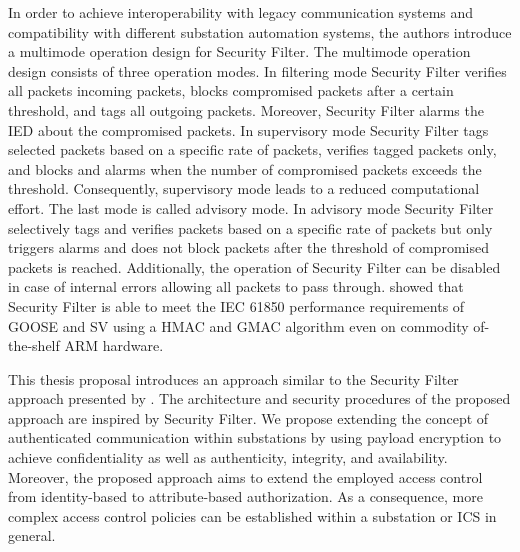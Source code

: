 In order to achieve interoperability with legacy communication systems and compatibility with different substation automation systems, the authors introduce a multimode operation design for Security Filter.
The multimode operation design consists of three operation modes.
In filtering mode Security Filter verifies all packets incoming packets, blocks compromised packets after a certain threshold, and tags all outgoing packets.
Moreover, Security Filter alarms the IED about the compromised packets.
In supervisory mode Security Filter tags selected packets based on a specific rate of packets, verifies tagged packets only, and blocks and alarms when the number of compromised packets exceeds the threshold.
Consequently, supervisory mode leads to a reduced computational effort.
The last mode is called advisory mode.
In advisory mode Security Filter selectively tags and verifies packets based on a specific rate of packets but only triggers alarms and does not block packets after the threshold of compromised packets is reached.
Additionally, the operation of Security Filter can be disabled in case of internal errors allowing all packets to pass through.
\citeauthor{Ishchenko2018} showed that Security Filter is able to meet the IEC 61850 performance requirements of GOOSE and SV using a HMAC and GMAC algorithm even on commodity of-the-shelf ARM hardware.

This thesis proposal introduces an approach similar to the Security Filter approach presented by \citeauthor{Ishchenko2018}.
The architecture and security procedures of the proposed approach are inspired by Security Filter.
We propose extending the concept of authenticated communication within substations by using payload encryption to achieve confidentiality as well as authenticity, integrity, and availability.
Moreover, the proposed approach aims to extend the employed access control from identity-based to attribute-based authorization.
As a consequence, more complex access control policies can be established within a substation or ICS in general.

